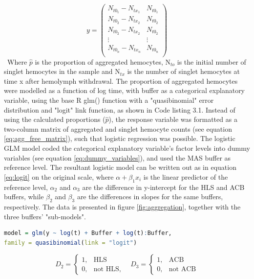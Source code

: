 \begin{equation}
    \label{eq:agg_free_matrix}
    y = 
    \begin{pmatrix}
      N_{t0_{1}} - N_{tx_{1}} &  N_{t0_{1}} \\
      N_{t0_{2}} - N_{tx_{2}} &  N_{t0_{2}} \\
      N_{t0_{2}} - N_{tx_{2}} &  N_{t0_{2}} \\
      \vdots                   & \vdots       \\
      N_{t0_{n}} - N_{tx_{n}} &  N_{t0_{n}} \\
    \end{pmatrix}
\end{equation}
\
Where $\hat{p}$ is the proportion of aggregated hemocytes, N$_{to}$ is the initial number of singlet hemocytes in the sample and N$_{tx}$ is the number of singlet hemocytes at time x after hemolymph withdrawal. The proportion of aggregated hemocytes were modelled as a function of log time, with buffer as a categorical explanatory variable, using the base R glm() function with a "quasibinomial" error distribution and "logit" link function, as shown in Code listing 3.1. Instead of using the calculated proportions ($\hat{p}$), the response variable was formatted as a two-column matrix of aggregated and singlet hemocyte counts (see equation \ref{eq:agg_free_matrix}), such that logistic regression was possible. The logistic GLM model coded the categorical explanatory variable's factor levels into dummy variables (see equation \ref{eq:dummy_variables}), and used the MAS buffer as reference level. The resultant logistic model can be written out as in equation \ref{eq:logit} on the original scale, where $\alpha + \beta_{1}x_{i}$ is the linear predictor of the reference level, $\alpha_{2}$ and $\alpha_{3}$ are the difference in y-intercept for the HLS and ACB buffers, while $\beta_{2}$ and $\beta_{3}$ are the differences in slopes for the same buffers, respectively. The data is presented in figure \ref{fig:aggregation}, together with the three buffers' "sub-models".

\begin{lstlisting}[language=R, caption = {The R source code run to fit the logistic proportion aggregation model.}]
model = glm(y ~ log(t) + Buffer + log(t):Buffer,
family = quasibinomial(link = "logit")
\end{lstlisting}

\begin{equation}
    \label{eq:dummy_variables}
D_{2} =\begin{cases}
      1, & \text{HLS}\\
      0, & \text{not HLS},
    \end{cases}
    \quad
D_{3} =\begin{cases}
      1, & \text{ACB}\\
      0, & \text{not ACB}
    \end{cases}
\end{equation}


